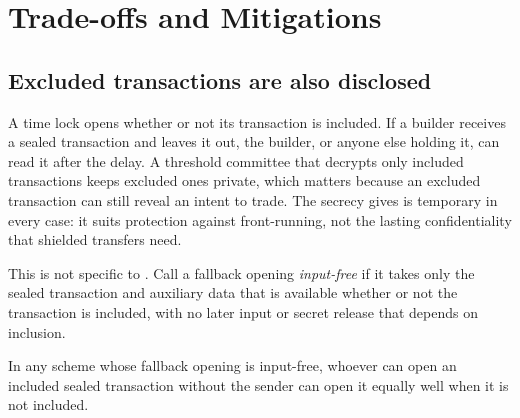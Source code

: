 \section{Trade-offs and Mitigations}\label{sec:tradeoffs}\label{sec:mitigations}

\subsection{Excluded transactions are also disclosed}\label{sec:noninclusion}

A time lock opens whether or not its transaction is included. If a builder receives a sealed transaction and leaves it out, the builder, or anyone else holding it, can read it after the delay. A threshold committee that decrypts only included transactions keeps excluded ones private, which matters because an excluded transaction can still reveal an intent to trade. The secrecy \leanseal gives is temporary in every case: it suits protection against front-running, not the lasting confidentiality that shielded transfers need.

This is not specific to \leanseal. Call a fallback opening \emph{input-free} if it takes only the sealed transaction and auxiliary data that is available whether or not the transaction is included, with no later input or secret release that depends on inclusion.

\begin{claim}[informal]\label{claim:noninclusion}
In any scheme whose fallback opening is input-free, whoever can open an included sealed transaction without the sender can open it equally well when it is not included.
\end{claim}


